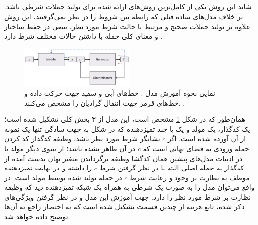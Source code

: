 \subsection{\towardctg}
شاید این روش یکی از کامل‌ترین روش‌های ارائه شده برای تولید جملات شرطی باشد. بر خلاف مدل‌های ساده قبلی که رابطه بین شروط را در نظر نمی‌گرفتند، این روش علاوه بر تولید جملات صحیح و مرتبط با حالت شرط مورد نظر، سعی در حفظ ساختار و معنای کلی جمله با داشتن حالات مختلف شرط دارد \cite{toward}.
\begin{figure}[h]
	\centering
	\includegraphics[width=0.5\textwidth]{images/toward1.png}
	\caption{
		نمایی نحوه آموزش مدل \towardctg. خط‌های آبی و سفید جهت حرکت داده و خط‌های قرمز جهت انتفال گرادیان را مشخص می‌کنند.
		\cite{toward}.}
	\label{fig:toward}
\end{figure}
همان‌طور که در شکل \ref{fig:toward} مشخص است، این مدل از ۳ بخش کلی تشکیل شده است؛ یک کدگذار، یک مولد و یک یا چند تمیزدهنده که در شکل به جهت سادگی تنها یک نمونه از آن آورده شده است. اگر $c$ نشانگر شرط مورد نظر باشد، وظیفه کدگذار کد کردن جمله ورودی به فضای نهانی است که $c$ در آن ظاهر نشده باشد؛ از سوی دیگر مولد یا در ادبیات مدل‌های پیشین همان کدگشا وظیفه برگرداندن متغیر نهان بدست آمده از کدگذار به جمله اصلی البته با در نظر گرفتن شرط $c$ را داشته و در نهایت تمیزدهنده موظف به نظارت بر وجود و رعایت شرط $c$ در جمله تولید شده توسط مولد است. در واقع می‌توان مدل را به صورت یک \vae{} شرطی به همراه یک شبکه تمیزدهنده دید که وظیفه نظارت بر شرط مورد نظر را دارد. جهت آموزش این مدل و در نظر گرفتن ویژگی‌های ذکر شده، تابع هزینه از چندین قسمت تشکیل شده است که به اختصار راجع به آن‌ها توضیح داده خواهد شد.\\

